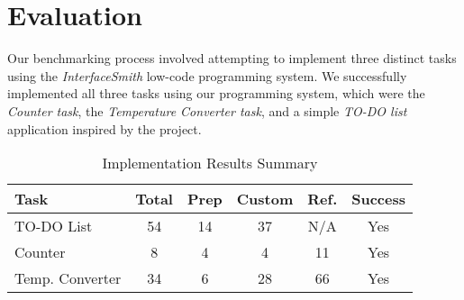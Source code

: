 \medskip
\section{Evaluation}

Our benchmarking process involved attempting to implement three distinct tasks using the \emph{InterfaceSmith} low-code programming system.
We successfully implemented all three tasks using our programming system, which were the \emph{Counter task}\cite{7GUIs-web},
the \emph{Temperature Converter task}\cite{7GUIs-web}, and a simple \emph{TO-DO list} application inspired by the \citet{TodoMVC} project.



\begin{table}[h]
	\centering
	\begin{tabular}{|p{3cm}|c|c|c|c|c|}
		\hline
		\textbf{Task}   & \textbf{Total} & \textbf{Prep} & \textbf{Custom} & \textbf{Ref.} & \textbf{Success} \\
		\hline
		TO-DO List      & 54             & 14            & 37              & N/A           & Yes              \\
		Counter         & 8              & 4             & 4               & 11            & Yes              \\
		Temp. Converter & 34             & 6             & 28              & 66            & Yes              \\
		\hline
	\end{tabular}
	\caption{Implementation Results Summary}
	\label{tab:results}
\end{table}

